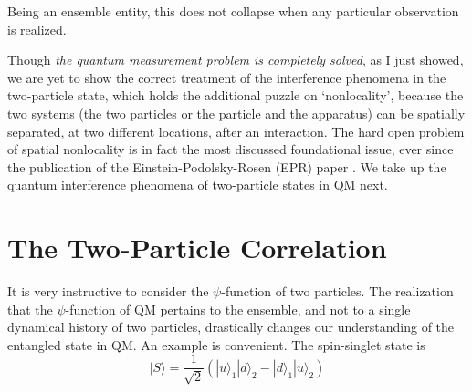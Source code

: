 Being an ensemble entity, this does not collapse when any particular observation is realized.

Though \textit{the quantum measurement problem is completely solved}, as I just showed, we are
yet to show the correct treatment of the interference phenomena in the two-particle state,
which holds the additional puzzle on `nonlocality', because the two systems (the two particles
or the particle and the apparatus) can be spatially separated, at two different locations, after
an interaction. The hard open problem of spatial nonlocality is in fact the most discussed
foundational issue, ever since the publication of the Einstein-Podolsky-Rosen (EPR) paper
\cite{chap14-key9}. We take up the quantum interference phenomena of two-particle states in QM next.


\section{The Two-Particle Correlation}\label{c14-sec7}

It is very instructive to consider the $\psi$-function of two particles. The realization that the
$\psi$-function of QM pertains to the ensemble, and not to a single dynamical history of two
particles, drastically changes our understanding of the entangled state in QM. An example
is convenient. The spin-singlet state is
\begin{equation*}
|S\rangle = \frac{1}{\sqrt{2}} (|u \rangle_1 | d \rangle_2 - | d \rangle_1 |u\rangle_2) \tag{33}\label{c14-eq33}
\end{equation*}

